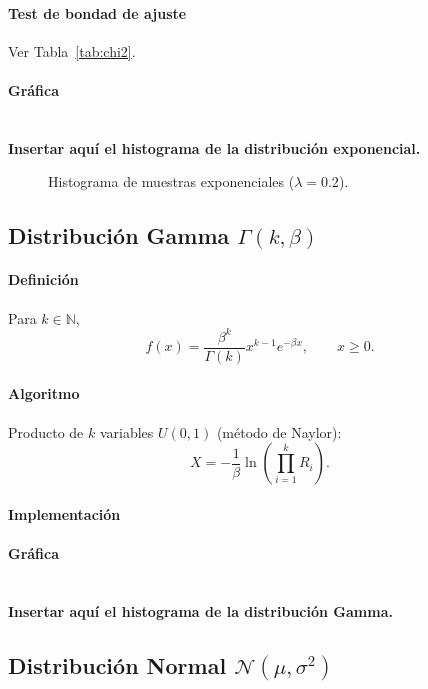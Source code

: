 \documentclass[11pt,a4paper]{article}
\begin{document}
\paragraph{Test de bondad de ajuste}
Ver Tabla~\ref{tab:chi2}.

\paragraph{Gráfica}\\
\textbf{Insertar aquí el histograma de la distribución exponencial.}
\begin{figure}[H]
    \centering
    \caption{Histograma de muestras exponenciales ($\lambda=0.2$).}
\end{figure}

\subsection{Distribución Gamma $\Gamma(k,\beta)$}
\paragraph{Definición}
Para $k\in\mathbb{N}$,
\[
f(x)=\frac{\beta^{k}}{\Gamma(k)}x^{k-1}e^{-\beta x},\qquad x\ge 0 .
\]

\paragraph{Algoritmo}
Producto de $k$ variables $U(0,1)$ (método de Naylor):
\[
X=-\frac{1}{\beta}\ln\left(\prod_{i=1}^{k}R_i\right).
\]

\paragraph{Implementación}


\paragraph{Gráfica}\\
\textbf{Insertar aquí el histograma de la distribución Gamma.}

\subsection{Distribución Normal $\mathcal{N}(\mu,\sigma^{2})$}
\end{document}
